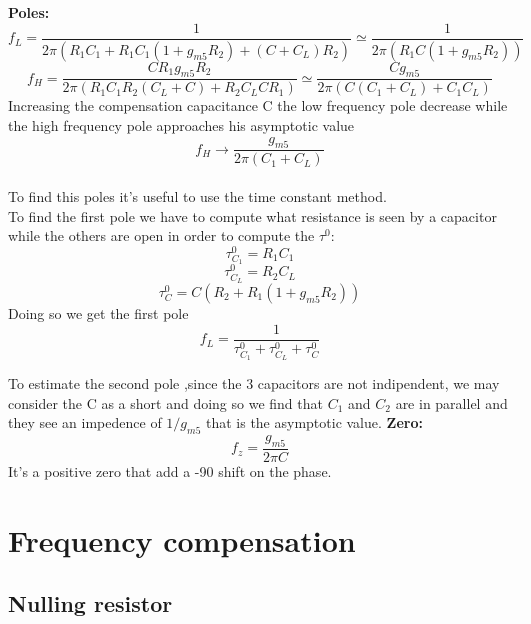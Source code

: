 {\bf Poles: }
\begin{equation}
f_L=\frac{1}{2\pi(R_1C_1+R_1C_1(1+g_{m5}R_2)+(C+C_L)R_2)}\simeq \frac{1}{2\pi(R_1C(1+g_{m5}R_2))}
\end{equation}
\begin{equation}
f_H=\frac{CR_1g_{m5}R_2}{2\pi(R_1C_1R_2(C_L+C)+R_2C_LCR_1)}\simeq \frac{Cg_{m5}}{2\pi(C(C_1+C_L)+C_1C_L)}
\end{equation}
Increasing the compensation capacitance C the low frequency pole decrease while the high frequency pole approaches his asymptotic value
\begin{equation}
f_H\rightarrow \frac{g_{m5}}{2\pi(C_1+C_L)}
\end{equation} 
\\
To find this poles it's useful to use the time constant method.\\
To find the first pole we have to compute what resistance is seen by a capacitor while the others are open in order to compute the $\tau^0$:\\
\begin{equation}
\tau^0_{C_1}=R_1C_1
\end{equation}
\begin{equation}
\tau^0_{C_L}=R_2C_L
\end{equation}
\begin{equation}
\tau^0_{C}=C(R_2+R_1(1+g_{m5}R_2))
\end{equation}
Doing so we get the first pole 
\begin{equation}
f_L=\frac{1}{\tau^0_{C_1}+\tau^0_{C_L}+\tau^0_{C}}
\end{equation}

To estimate the second pole ,since the 3 capacitors are not indipendent, we may consider the C as a short and doing so we find that $C_1$ and $C_2$ are in parallel and they see an impedence of $1/g_{m5}$ that is the asymptotic value.
\newline
{\bf Zero: }
\begin{equation}
f_z=\frac{g_{m5}}{2\pi C}
\end{equation}
It's a positive zero that add a -90 shift on the phase.\\

\section{Frequency compensation}
\subsection{Nulling resistor}

